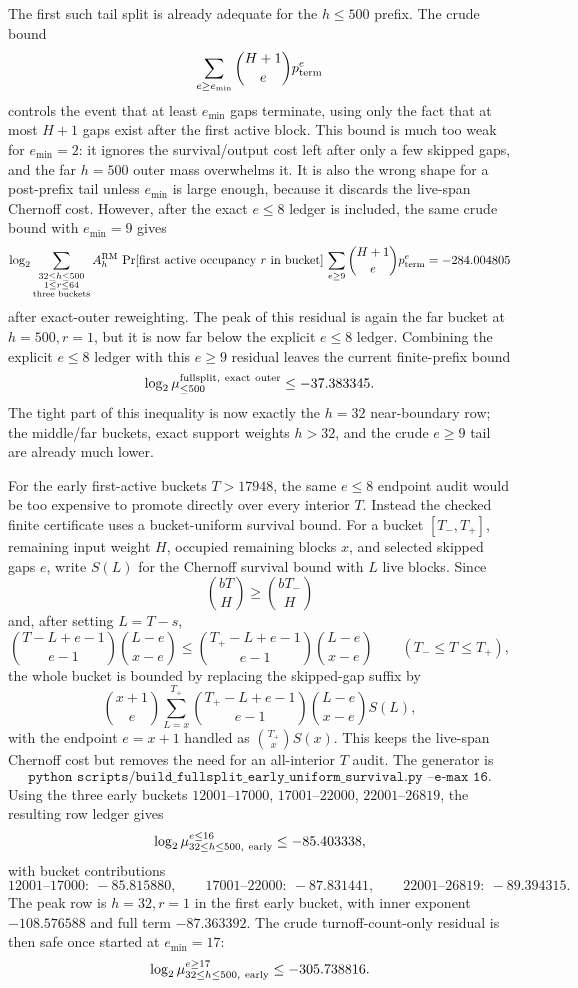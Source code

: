 The first such tail split is already adequate for the \(h\le500\) prefix.  The crude bound
\[
\sum_{e\ge e_{\min}}\binom{H+1}{e}p_{\rm term}^e
\]
controls the event that at least \(e_{\min}\) gaps terminate, using only the fact that at most \(H+1\) gaps exist after
the first active block.  This bound is much too weak for \(e_{\min}=2\): it ignores the survival/output cost left after
only a few skipped gaps, and the far \(h=500\) outer mass overwhelms it.  It is also the wrong shape for a post-prefix
tail unless \(e_{\min}\) is large enough, because it discards the live-span Chernoff cost.  However, after the exact
\(e\le8\) ledger is included, the same crude bound with \(e_{\min}=9\) gives
\[
\log_2\sum_{\substack{32\le h\le500\\1\le r\le64\\\text{three buckets}}}
A_h^{\rm RM}\,
\Pr[\text{first active occupancy }r\text{ in bucket}]\,
\sum_{e\ge9}\binom{H+1}{e}p_{\rm term}^e
=-284.004805
\]
after exact-outer reweighting.  The peak of this residual is again the far bucket at \(h=500,r=1\), but it is now far
below the explicit \(e\le8\) ledger.  Combining the explicit \(e\le8\) ledger with this \(e\ge9\) residual leaves the
current finite-prefix bound
\[
\log_2 \mu_{\le500}^{\rm fullsplit,\ exact\ outer}\le -37.383345.
\]
The tight part of this inequality is now exactly the \(h=32\) near-boundary row; the middle/far buckets, exact support
weights \(h>32\), and the crude \(e\ge9\) tail are already much lower.

For the early first-active buckets \(T>17948\), the same \(e\le8\) endpoint audit would be too expensive to promote
directly over every interior \(T\).  Instead the checked finite certificate uses a bucket-uniform survival bound.  For a
bucket \([T_-,T_+]\), remaining input weight \(H\), occupied remaining blocks \(x\), and selected skipped gaps \(e\),
write \(S(L)\) for the Chernoff survival bound with \(L\) live blocks.  Since
\[
\binom{bT}{H}\ge \binom{bT_-}{H}
\]
and, after setting \(L=T-s\),
\[
\binom{T-L+e-1}{e-1}\binom{L-e}{x-e}
\le
\binom{T_+-L+e-1}{e-1}\binom{L-e}{x-e}
\qquad (T_-\le T\le T_+),
\]
the whole bucket is bounded by replacing the skipped-gap suffix by
\[
\binom{x+1}{e}
\sum_{L=x}^{T_+}
\binom{T_+-L+e-1}{e-1}\binom{L-e}{x-e}S(L),
\]
with the endpoint \(e=x+1\) handled as \(\binom{T_+}{x}S(x)\).  This keeps the live-span Chernoff cost but removes the
need for an all-interior \(T\) audit.  The generator is
\[
\texttt{python scripts/build\_fullsplit\_early\_uniform\_survival.py --e-max 16}.
\]
Using the three early buckets \(12001\text{--}17000\), \(17001\text{--}22000\), \(22001\text{--}26819\), the resulting
row ledger gives
\[
\log_2 \mu_{32\le h\le500,\ {\rm early}}^{e\le16}\le -85.403338,
\]
with bucket contributions
\[
12001\text{--}17000:\ -85.815880,\qquad
17001\text{--}22000:\ -87.831441,\qquad
22001\text{--}26819:\ -89.394315.
\]
The peak row is \(h=32,r=1\) in the first early bucket, with inner exponent \(-108.576588\) and full term
\(-87.363392\).  The crude turnoff-count-only residual is then safe once started at \(e_{\min}=17\):
\[
\log_2 \mu_{32\le h\le500,\ {\rm early}}^{e\ge17}\le -305.738816.
\]

